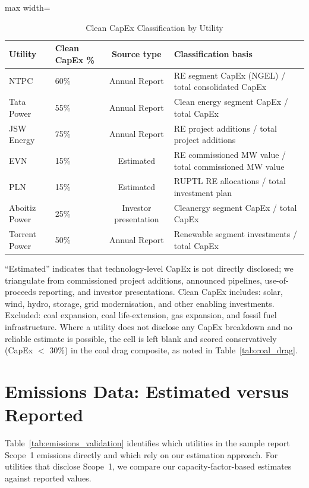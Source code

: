 \documentclass[review,3p,authoryear]{elsarticle}
\begin{document}
\begin{table}[H]
\centering
\caption{Clean CapEx Classification by Utility}
\label{tab:capex_criteria}
\small
\begin{adjustbox}{max width=\linewidth}
\begin{tabular}{@{}llcl@{}}
\toprule
\textbf{Utility} & \textbf{Clean CapEx \%} & \textbf{Source type} & \textbf{Classification basis} \\
\midrule
NTPC & 60\% & Annual Report & RE segment CapEx (NGEL) / total consolidated CapEx \\
Tata Power & 55\% & Annual Report & Clean energy segment CapEx / total CapEx \\
JSW Energy & 75\% & Annual Report & RE project additions / total project additions \\
EVN & 15\% & Estimated & RE commissioned MW value / total commissioned MW value \\
PLN & 15\% & Estimated & RUPTL RE allocations / total investment plan \\
Aboitiz Power & 25\% & Investor presentation & Cleanergy segment CapEx / total CapEx \\
Torrent Power & 50\% & Annual Report & Renewable segment investments / total CapEx \\
\bottomrule
\end{tabular}
\end{adjustbox}
\begin{flushleft}
\footnotesize{``Estimated'' indicates that technology-level CapEx is not directly disclosed; we triangulate from commissioned project additions, announced pipelines, use-of-proceeds reporting, and investor presentations. Clean CapEx includes: solar, wind, hydro, storage, grid modernisation, and other enabling investments. Excluded: coal expansion, coal life-extension, gas expansion, and fossil fuel infrastructure. Where a utility does not disclose any CapEx breakdown and no reliable estimate is possible, the cell is left blank and scored conservatively (CapEx $<$ 30\%) in the coal drag composite, as noted in Table~\ref{tab:coal_drag}.}
\end{flushleft}
\end{table}

\section{Emissions Data: Estimated versus Reported}
\label{app:emissions_validation}

Table~\ref{tab:emissions_validation} identifies which utilities in the sample report Scope~1 emissions directly and which rely on our estimation approach. For utilities that disclose Scope~1, we compare our capacity-factor-based estimates against reported values.
\end{document}
